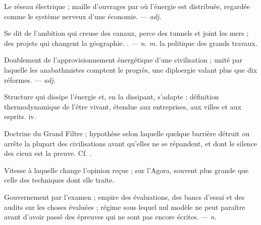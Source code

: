  Le réseau électrique ; maille d'ouvrages par où l'énergie est distribuée, regardée comme le système nerveux d'une économie.  ---  \textit{adj.}

 Se dit de l'ambition qui creuse des canaux, perce des tunnels et joint les mers ; des projets qui changent la géographie. . ---  \textit{n. m.} la politique des grands travaux.

 Doublement de l'approvisionnement énergétique d'une civilisation ; unité par laquelle les anabathmistes comptent le progrès, une diploergie valant plus que dix réformes.  ---  \textit{adj.}

 Structure qui dissipe l'énergie et, en la dissipant, s'adapte ; définition thermodynamique de l'être vivant, étendue aux entreprises, aux villes et aux esprits.   iv.

 Doctrine du Grand Filtre ; hypothèse selon laquelle quelque barrière détruit ou arrête la plupart des civilisations avant qu'elles ne se répandent, et dont le silence des cieux est la preuve.  Cf. .

 Vitesse à laquelle change l'opinion reçue ; sur l'Agora, souvent plus grande que celle des techniques dont elle traite. 

 Gouvernement par l'examen ;  empire des évaluations, des bancs d'essai et des audits sur les choses évaluées ;   régime sous lequel nul modèle ne peut paraître avant d'avoir passé des épreuves qui ne sont pas encore écrites.   ---  \textit{n.}

